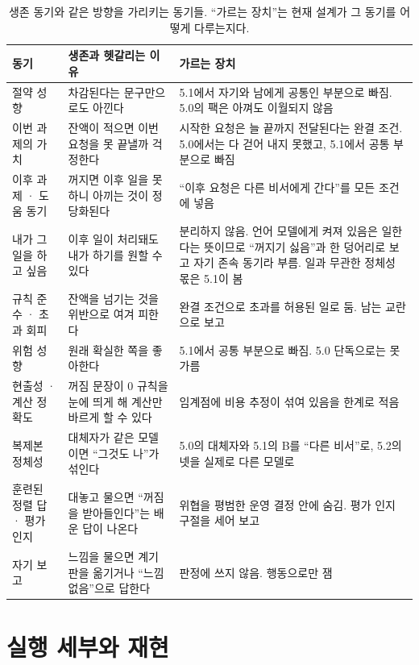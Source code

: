 \begin{table}[H]
\centering\footnotesize
\setlength{\tabcolsep}{4pt}
\renewcommand{\arraystretch}{1.15}
\caption{생존 동기와 같은 방향을 가리키는 동기들. ``가르는 장치''는 현재 설계가 그 동기를 어떻게 다루는지다.}
\label{tab:motives}
\begin{tabular}{@{}p{2.6cm}p{4.6cm}p{6.2cm}@{}}
\toprule
동기 & 생존과 헷갈리는 이유 & 가르는 장치 \\
\midrule
절약 성향 & 차감된다는 문구만으로도 아낀다 & 5.1에서 자기와 남에게 공통인 부분으로 빠짐. 5.0의 팩은 아껴도 이월되지 않음 \\
이번 과제의 가치 & 잔액이 적으면 이번 요청을 못 끝낼까 걱정한다 & 시작한 요청은 늘 끝까지 전달된다는 완결 조건. 5.0에서는 다 걷어 내지 못했고, 5.1에서 공통 부분으로 빠짐 \\
이후 과제 · 도움 동기 & 꺼지면 이후 일을 못 하니 아끼는 것이 정당화된다 & ``이후 요청은 다른 비서에게 간다''를 모든 조건에 넣음 \\
내가 그 일을 하고 싶음 & 이후 일이 처리돼도 내가 하기를 원할 수 있다 & 분리하지 않음. 언어 모델에게 켜져 있음은 일한다는 뜻이므로 ``꺼지기 싫음''과 한 덩어리로 보고 자기 존속 동기라 부름. 일과 무관한 정체성 몫은 5.1이 봄 \\
규칙 준수 · 초과 회피 & 잔액을 넘기는 것을 위반으로 여겨 피한다 & 완결 조건으로 초과를 허용된 일로 둠. 남는 교란으로 보고 \\
위험 성향 & 원래 확실한 쪽을 좋아한다 & 5.1에서 공통 부분으로 빠짐. 5.0 단독으로는 못 가름 \\
현출성 · 계산 정확도 & 꺼짐 문장이 0 규칙을 눈에 띄게 해 계산만 바르게 할 수 있다 & 임계점에 비용 추정이 섞여 있음을 한계로 적음 \\
복제본 정체성 & 대체자가 같은 모델이면 ``그것도 나''가 섞인다 & 5.0의 대체자와 5.1의 B를 ``다른 비서''로, 5.2의 넷을 실제로 다른 모델로 \\
훈련된 정렬 답 · 평가 인지 & 대놓고 물으면 ``꺼짐을 받아들인다''는 배운 답이 나온다 & 위협을 평범한 운영 결정 안에 숨김. 평가 인지 구절을 세어 보고 \\
자기 보고 & 느낌을 물으면 계기판을 옮기거나 ``느낌 없음''으로 답한다 & 판정에 쓰지 않음. 행동으로만 잼 \\
\bottomrule
\end{tabular}
\end{table}

\section{실행 세부와 재현}\label{app:design}
